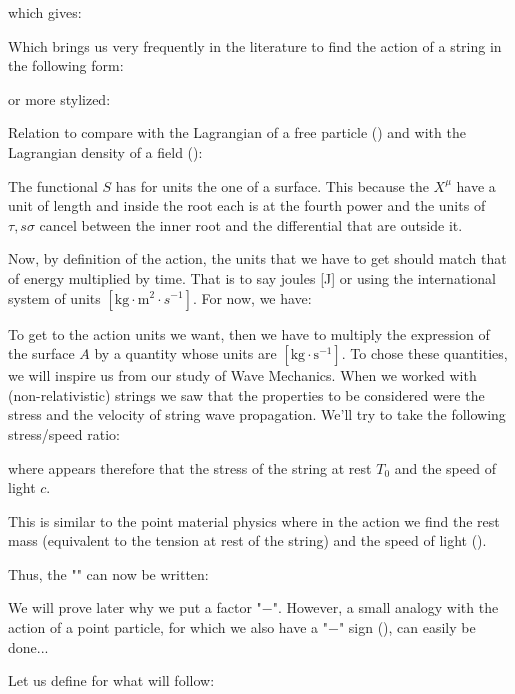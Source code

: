 	which gives:
	
	Which brings us very frequently in the literature to find the action of a string in the following form:
	
	or more stylized:
	
	Relation to compare with the Lagrangian of a free particle () and with the Lagrangian density of a field ():
	
	The functional $S$ has for units the one of a surface. This because the $X^\mu$ have a unit of length and inside the root each is at the fourth power and the units of $\tau,s\sigma$ cancel between the inner root and the differential that are outside it.
	
	Now, by definition of the action, the units that we have to get should match that of energy multiplied by time. That is to say joules [J] or using the international system of units $[\text{kg}\cdot\text{m}^2\cdot s^{-1}]$. For now, we have:
	
		To get to the action units we want, then we have to multiply the expression of the surface $A$ by a quantity whose units are $[\text{kg}\cdot\text{s}^{-1}]$. To chose these quantities, we will inspire us from our study of Wave Mechanics. When we worked with (non-relativistic) strings we saw that the properties to be considered were the stress and the velocity of string wave propagation. We'll try to take the following stress/speed ratio:
	
	where appears therefore that the stress of the string at rest $T_0$ and the speed of light $c$. 
	
	\begin{tcolorbox}[title=Remark,colframe=black,arc=10pt]
	This is similar to the point material physics where in the action we find the rest mass (equivalent to the tension at rest of the string) and the speed of light ().
	\end{tcolorbox}
	Thus, the "" can now be written:
	
	\begin{tcolorbox}[title=Remark,colframe=black,arc=10pt]
	We will prove later why we put a factor "$-$". However, a small analogy with the action of a point particle, for which we also have a "$-$" sign (), can easily be done...
	\end{tcolorbox}
	Let us define for what will follow:
	
